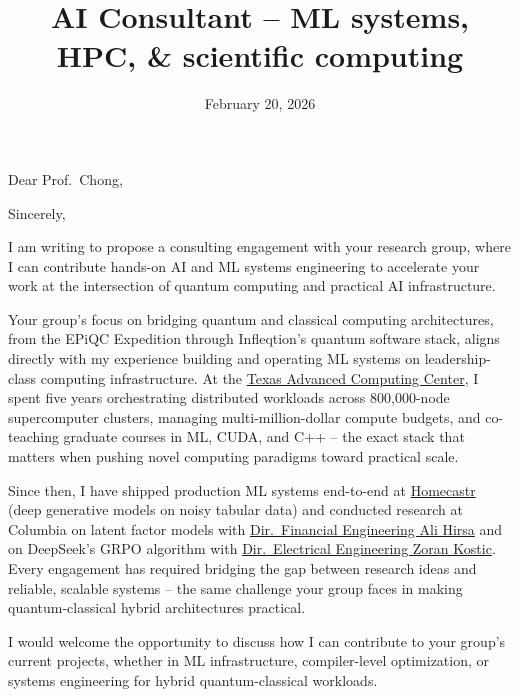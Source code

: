 \documentclass[letterpaper, 10pt,colorlinks,linkcolor=cyan]{moderncv}
\title{\large AI Consultant -- ML systems, HPC, \& scientific computing}
\begin{document}
  \hypersetup{urlcolor=links}

  \date{February 20, 2026}
  \opening{Dear Prof.\ Chong,}
  \closing{Sincerely,}
  \makelettertitle

I am writing to propose a consulting engagement with your research group, where I can contribute hands-on AI and ML systems engineering to accelerate your work at the intersection of quantum computing and practical AI infrastructure.

Your group's focus on bridging quantum and classical computing architectures, from the EPiQC Expedition through Infleqtion's quantum software stack, aligns directly with my experience building and operating ML systems on leadership-class computing infrastructure. At the \href{https://www.tacc.utexas.edu/}{Texas Advanced Computing Center}, I spent five years orchestrating distributed workloads across 800,000-node supercomputer clusters, managing multi-million-dollar compute budgets, and co-teaching graduate courses in ML, CUDA, and C++ -- the exact stack that matters when pushing novel computing paradigms toward practical scale.

Since then, I have shipped production ML systems end-to-end at \href{https://www.homecastr.com/}{Homecastr} (deep generative models on noisy tabular data) and conducted research at Columbia on latent factor models with \href{https://alihrsa.github.io/}{Dir.\ Financial Engineering Ali Hirsa} and on DeepSeek's GRPO algorithm with \href{https://kostic.ece.columbia.edu/}{Dir.\ Electrical Engineering Zoran Kostic}. Every engagement has required bridging the gap between research ideas and reliable, scalable systems -- the same challenge your group faces in making quantum-classical hybrid architectures practical.

I would welcome the opportunity to discuss how I can contribute to your group's current projects, whether in ML infrastructure, compiler-level optimization, or systems engineering for hybrid quantum-classical workloads.

  \makeletterclosing
  \clearpage

  \vspace*{-2.5em}
  \makecvtitle
\end{document}

